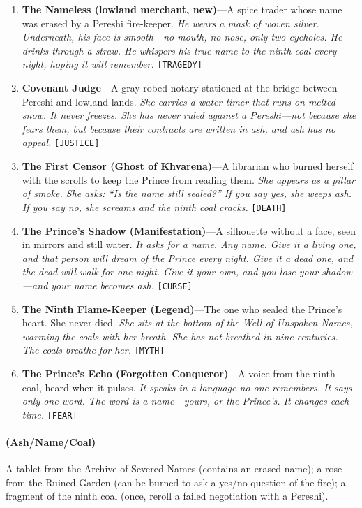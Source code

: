\begin{enumerate}
\item \textbf{The Nameless (lowland merchant, new)}---A spice trader whose name was erased by a Pereshi fire-keeper.
  \hfill \textit{He wears a mask of woven silver. Underneath, his face is smooth---no mouth, no nose, only two eyeholes. He drinks through a straw. He whispers his true name to the ninth coal every night, hoping it will remember.} \texttt{[TRAGEDY]}
\item \textbf{Covenant Judge}---A gray-robed notary stationed at the bridge between Pereshi and lowland lands.
  \hfill \textit{She carries a water-timer that runs on melted snow. It never freezes. She has never ruled against a Pereshi---not because she fears them, but because their contracts are written in ash, and ash has no appeal.} \texttt{[JUSTICE]}
\item[J] \textbf{The First Censor (Ghost of Khvarena)}---A librarian who burned herself with the scrolls to keep the Prince from reading them.
  \hfill \textit{She appears as a pillar of smoke. She asks: ``Is the name still sealed?'' If you say yes, she weeps ash. If you say no, she screams and the ninth coal cracks.} \texttt{[DEATH]}
\item[Q] \textbf{The Prince's Shadow (Manifestation)}---A silhouette without a face, seen in mirrors and still water.
  \hfill \textit{It asks for a name. Any name. Give it a living one, and that person will dream of the Prince every night. Give it a dead one, and the dead will walk for one night. Give it your own, and you lose your shadow---and your name becomes ash.} \texttt{[CURSE]}
\item[K] \textbf{The Ninth Flame-Keeper (Legend)}---The one who sealed the Prince's heart. She never died.
  \hfill \textit{She sits at the bottom of the Well of Unspoken Names, warming the coals with her breath. She has not breathed in nine centuries. The coals breathe for her.} \texttt{[MYTH]}
\item[A] \textbf{The Prince's Echo (Forgotten Conqueror)}---A voice from the ninth coal, heard when it pulses.
  \hfill \textit{It speaks in a language no one remembers. It says only one word. The word is a name---yours, or the Prince's. It changes each time.} \texttt{[FEAR]}
\end{enumerate}

\paragraph*{(Ash/Name/Coal)} A tablet from the Archive of Severed Names (contains an erased name); a rose from the Ruined Garden (can be burned to ask a yes/no question of the fire); a fragment of the ninth coal (once, reroll a failed negotiation with a Pereshi).

